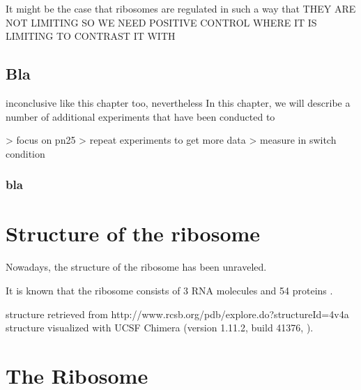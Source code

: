It might be the case that ribosomes are regulated in such a way that 
THEY ARE NOT LIMITING
SO WE NEED POSITIVE CONTROL WHERE IT IS LIMITING TO CONTRAST IT WITH

\subsection*{Bla}

inconclusive
like this chapter too,
nevertheless
%
In this chapter, we will describe a number of additional experiments that have been conducted to 

> focus on pn25
> repeat experiments to get more data
> measure in switch condition

\subsubsection*{bla}



\section{Structure of the ribosome}

Nowadays, the structure of the ribosome has been unraveled.

It is known that the ribosome consists of 3 RNA molecules and 54 proteins \cite{Chen2013}.%

structure retrieved from
http://www.rcsb.org/pdb/explore.do?structureId=4v4a
structure visualized with UCSF Chimera (version 1.11.2, build 41376, \cite{pettersen2004}).



% 



\section{The Ribosome}





